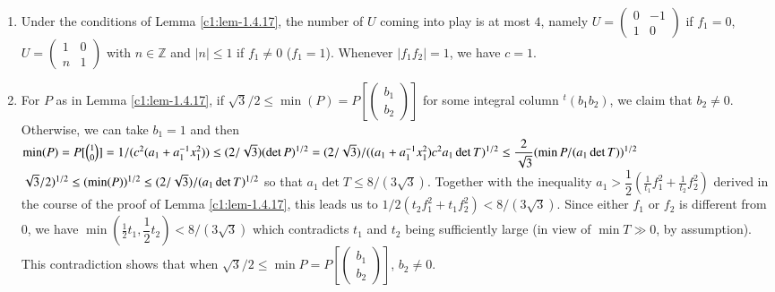\begin{remarks*}
\begin{enumerate}
\renewcommand{\labelenumi}{\theenumi)}
\item Under the conditions of Lemma \ref{c1:lem-1.4.17}, the number of
  $U$ coming into play is at most $4$, namely
  $U=\left(\begin{smallmatrix} 0 & -1\\ 1 & 0
\end{smallmatrix}\right)$ if $f_{1}=0$, $U=\left(\begin{smallmatrix} 1
  & 0\\ n & 1\end{smallmatrix}\right)$ with $n\in\mathbb{Z}$ and
  $|n|\leq 1$ if $f_{1}\neq 0$ (\ie $f_{1}=1$). Whenever
  $|f_{1}f_{2}|=1$, we have $c=1$.

\item For $P$ as in Lemma \ref{c1:lem-1.4.17}, if $\sqrt{3}/2\leq
  \min(P)=P\left[\left(\begin{smallmatrix} b_{1}
      \\ b_{2}\end{smallmatrix}\right)\right]$ for some integral column
  ${}^{t}(b_{1}b_{2})$, we claim that $b_{2}\neq 0$. Otherwise, we can
  take $b_{1}=1$ and then
  $\min(P)=P[\binom{1}{0}]=1/(c^{2}(a_{1}+a^{-1}_{1}x^{2}_{1}))\leq
  (2/\sqrt{3})(\det
  P)^{1/2}=(2/\sqrt{3})/((a_{1}+a^{-1}_{1}x^{2}_{1})c^{2}a_{1}\det
  T)^{1/2}\leq \dfrac{2}{\sqrt{3}}\break(\min P/(a_{1}\det T))^{1/2}$ \ie
  $\sqrt{3}/2)^{1/2}\leq (\min (P))^{1/2}\leq (2/\sqrt{3})/(a_{1}\break\det
  T)^{1/2}$ so that $a_{1}\det T\leq 8/(3\sqrt{3})$. Together with the
  inequality
  $a_{1}>\dfrac{1}{2}\left(\frac{1}{t_{1}}f^{2}_{1}+\frac{1}{t_{2}}f^{2}_{2}\right)$
  derived in the course of the proof of Lemma \ref{c1:lem-1.4.17}, this
  leads us to
  $1/2(t_{2}f^{2}_{1}+t_{1}f^{2}_{2})<8/(3\sqrt{3})$. Since either
  $f_{1}$ or $f_{2}$ is different from $0$, we have
  $\min\left(\frac{1}{2} t_{1},\dfrac{1}{2}t_{2}\right)<8/(3\sqrt{3})$
  which contradicts $t_{1}$ and $t_{2}$ being sufficiently large (in
  view of $\min T\gg 0$, by assumption). This contradiction shows that
  when $\sqrt{3}/2\leq \min P=P\left[\left(\begin{smallmatrix}
      b_{1}\\ b_{2}\end{smallmatrix}
    \right)\right]$, $b_{2}\neq 0$. 



\end{enumerate}
\end{remarks*}
